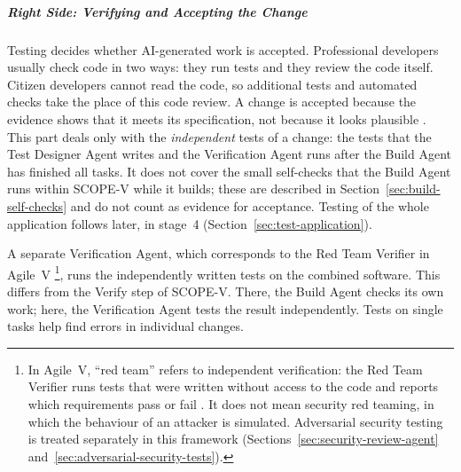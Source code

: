 \documentclass[10pt,a4paper]{article}
\begin{document}
\subparagraph{Right Side: Verifying and Accepting the Change}
\label{sec:testing-verification}

Testing decides whether AI-generated work is accepted. Professional developers usually check code in two ways: they run tests and
they review the code itself. Citizen developers cannot read the code, so
additional tests and automated checks take the place of this code review. A change is
accepted because the evidence shows that it meets its specification, not
because it looks plausible \parencite{koch2026agentic}. This part deals only
with the \emph{independent} tests of a change: the tests that the Test
Designer Agent writes and the Verification Agent runs after the Build Agent
has finished all tasks. It does not cover the small self-checks that the
Build Agent runs within SCOPE-V while it builds; these are described in
Section~\ref{sec:build-self-checks} and do not count as evidence for
acceptance. Testing of the whole application follows later, in stage~4
(Section~\ref{sec:test-application}).

A separate Verification Agent, which corresponds to
the Red Team Verifier in Agile~V \parencite{koch2026agile} \footnote{In Agile~V, \enquote{red team} refers to independent
verification: the Red Team Verifier runs tests that were written without
access to the code and reports which requirements pass or fail
\parencite{koch2026agile}. It does not mean security red teaming, in which
the behaviour of an attacker is simulated. Adversarial security testing is
treated separately in this framework
(Sections~\ref{sec:security-review-agent}
and~\ref{sec:adversarial-security-tests}).}, runs the
independently written tests on the combined software. This differs from the
Verify step of SCOPE-V. There, the Build Agent checks its own work; here, the
Verification Agent tests the result independently. Tests on single tasks help
find errors in individual changes. 
\end{document}
